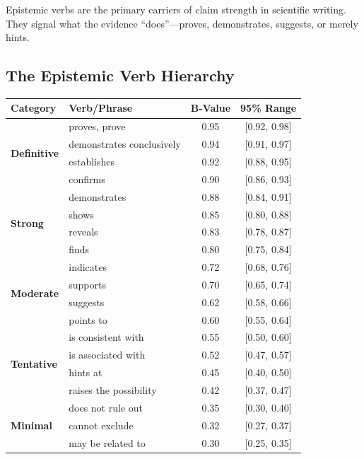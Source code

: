 \documentclass[11pt,a4paper]{article}
\theoremstyle{remark}
\begin{document}
Epistemic verbs are the primary carriers of claim strength in scientific writing. They signal what the evidence ``does''---proves, demonstrates, suggests, or merely hints.

\subsection{The Epistemic Verb Hierarchy}

\begin{lexiconbox}[title={Epistemic Verb B-Values}]
\begin{center}
\begin{tabular}{llcc}
\toprule
\textbf{Category} & \textbf{Verb/Phrase} & \textbf{B-Value} & \textbf{95\% Range} \\
\midrule
\multirow{4}{*}{\textcolor{strongcolor}{\textbf{Definitive}}}
    & proves, prove & 0.95 & [0.92, 0.98] \\
    & demonstrates conclusively & 0.94 & [0.91, 0.97] \\
    & establishes & 0.92 & [0.88, 0.95] \\
    & confirms & 0.90 & [0.86, 0.93] \\
\midrule
\multirow{4}{*}{\textcolor{strongcolor}{\textbf{Strong}}}
    & demonstrates & 0.88 & [0.84, 0.91] \\
    & shows & 0.85 & [0.80, 0.88] \\
    & reveals & 0.83 & [0.78, 0.87] \\
    & finds & 0.80 & [0.75, 0.84] \\
\midrule
\multirow{4}{*}{\textcolor{moderatecolor}{\textbf{Moderate}}}
    & indicates & 0.72 & [0.68, 0.76] \\
    & supports & 0.70 & [0.65, 0.74] \\
    & suggests & 0.62 & [0.58, 0.66] \\
    & points to & 0.60 & [0.55, 0.64] \\
\midrule
\multirow{4}{*}{\textcolor{weakcolor}{\textbf{Tentative}}}
    & is consistent with & 0.55 & [0.50, 0.60] \\
    & is associated with & 0.52 & [0.47, 0.57] \\
    & hints at & 0.45 & [0.40, 0.50] \\
    & raises the possibility & 0.42 & [0.37, 0.47] \\
\midrule
\multirow{3}{*}{\textcolor{weakcolor}{\textbf{Minimal}}}
    & does not rule out & 0.35 & [0.30, 0.40] \\
    & cannot exclude & 0.32 & [0.27, 0.37] \\
    & may be related to & 0.30 & [0.25, 0.35] \\
\bottomrule
\end{tabular}
\end{center}
\end{lexiconbox}
\end{document}
